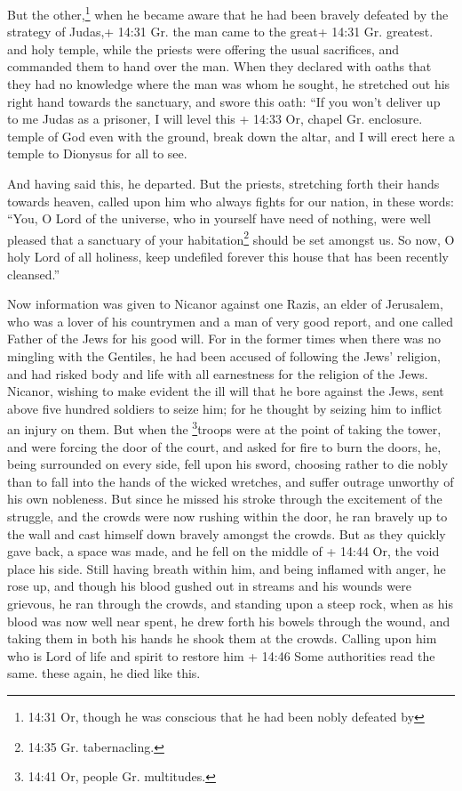  But the other,\footnote{14:31 Or, though he was conscious
  that he had been nobly defeated by} when he became aware that he had
been bravely defeated by the strategy of Judas,+ 14:31 Gr. the man came
to the great+ 14:31 Gr. greatest. and holy temple, while the priests
were offering the usual sacrifices, and commanded them to hand over the
man.  When they declared with oaths that they had no
knowledge where the man was whom he sought,  he stretched
out his right hand towards the sanctuary, and swore this oath: ``If you
won't deliver up to me Judas as a prisoner, I will level this + 14:33
Or, chapel Gr. enclosure. temple of God even with the ground, break down
the altar, and I will erect here a temple to Dionysus for all to see.

 And having said this, he departed. But the priests,
stretching forth their hands towards heaven, called upon him who always
fights for our nation, in these words:  ``You, O Lord of
the universe, who in yourself have need of nothing, were well pleased
that a sanctuary of your habitation\footnote{14:35 Gr. tabernacling.}
should be set amongst us.  So now, O holy Lord of all
holiness, keep undefiled forever this house that has been recently
cleansed.''

 Now information was given to Nicanor against one Razis, an
elder of Jerusalem, who was a lover of his countrymen and a man of very
good report, and one called Father of the Jews for his good will.
 For in the former times when there was no mingling with
the Gentiles, he had been accused of following the Jews' religion, and
had risked body and life with all earnestness for the religion of the
Jews.  Nicanor, wishing to make evident the ill will that
he bore against the Jews, sent above five hundred soldiers to seize him;
 for he thought by seizing him to inflict an injury on
them.  But when the \footnote{14:41 Or, people Gr.
  multitudes.}troops were at the point of taking the tower, and were
forcing the door of the court, and asked for fire to burn the doors, he,
being surrounded on every side, fell upon his sword, 
choosing rather to die nobly than to fall into the hands of the wicked
wretches, and suffer outrage unworthy of his own nobleness.
 But since he missed his stroke through the excitement of
the struggle, and the crowds were now rushing within the door, he ran
bravely up to the wall and cast himself down bravely amongst the crowds.
 But as they quickly gave back, a space was made, and he
fell on the middle of + 14:44 Or, the void place his side. 
Still having breath within him, and being inflamed with anger, he rose
up, and though his blood gushed out in streams and his wounds were
grievous, he ran through the crowds, and standing upon a steep rock,
 when as his blood was now well near spent, he drew forth
his bowels through the wound, and taking them in both his hands he shook
them at the crowds. Calling upon him who is Lord of life and spirit to
restore him + 14:46 Some authorities read the same. these again, he died
like this.

